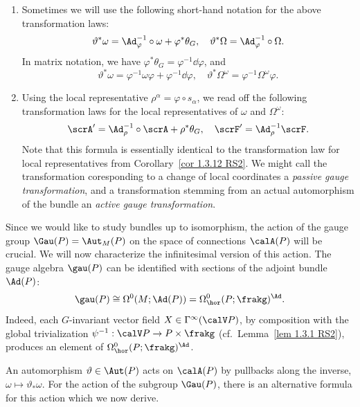 \begin{rem}\label{rem 1.8.8 RS2}
    \begin{enumerate}
        \item Sometimes we will use the following short-hand notation for the above transformation laws:
        \[\vartheta^\ast\omega=\Ad_{\varphi}^{-1}\circ\omega+\varphi^\ast\theta_G,\quad \vartheta^\ast \Omega=\Ad_\varphi^{-1}\circ\Omega.\]
        In matrix notation, we have $\varphi^\ast\theta_G=\varphi^{-1}\dd\varphi$, and 
        \[\vartheta^\ast\omega=\varphi^{-1}\omega\varphi+\varphi^{-1}\dd\varphi,\quad \vartheta^\ast\Omega^\omega=\varphi^{-1}\Omega^\omega \varphi.\]
        \item Using the local representative $\rho^\alpha=\varphi\circ s_\alpha$, we read off the following transformation laws for the local representatives of $\omega$ and $\Omega^\omega$:
        \[\scrA'=\Ad_\rho^{-1}\circ\scrA+\rho^\ast\theta_G,\quad \scrF'=\Ad_\rho^{-1}\scrF.\]
        Note that this formula is essentially identical to the transformation law for local representatives from Corollary~\ref{cor 1.3.12 RS2}. We might call the transformation coresponding to a change of local coordinates a \emph{passive gauge transformation}, and a transformation stemming from an actual automorphism of the bundle an \emph{active gauge transformation}.
    \end{enumerate}
\end{rem}


Since we would like to study bundles up to isomorphism, the action of the gauge group $\Gau(P)=\Aut_M(P)$ on the space of connections $\calA(P)$ will be crucial. We will now characterize the infinitesimal version of this action. The gauge algebra $\gau(P)$ can be identified with sections of the adjoint bundle $\Ad(P)$:
\[\gau(P)\cong \Omega^0(M;\Ad(P))=\Omega^0_{\hor}(P;\frakg)^\Ad.\]
Indeed, each $G$-invariant vector field $X\in\Gamma^\infty(\calV P)$, by composition with the global trivialization $\psi^{-1}:\calV P\to P\times\frakg$ (cf.\ Lemma~\ref{lem 1.3.1 RS2}), produces an element of $\Omega^0_{\hor}(P;\frakg)^\Ad$.

An automorphism $\vartheta\in\Aut(P)$ acts on $\calA(P)$ by pullbacks along the inverse, $\omega\mapsto \vartheta_\ast\omega$. For the action of the subgroup $\Gau(P)$, there is an alternative formula for this action which we now derive. 

